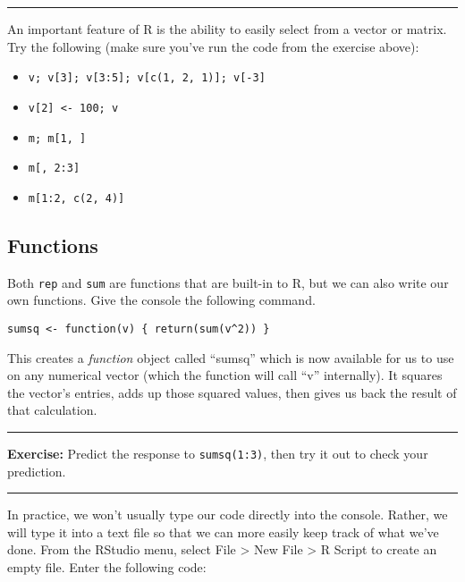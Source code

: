 \documentclass[]{book}
\providecommand{\tightlist}{%
  \setlength{\itemsep}{0pt}\setlength{\parskip}{0pt}}
\theoremstyle{definition}
\theoremstyle{definition}
\theoremstyle{definition}
\theoremstyle{remark}
\begin{document}
\begin{center}\rule{0.5\linewidth}{\linethickness}\end{center}

An important feature of R is the ability to easily select from a vector
or matrix. Try the following (make sure you've run the code from the
exercise above):

\begin{itemize}
\tightlist
\item
  \texttt{v;\ v{[}3{]};\ v{[}3:5{]};\ v{[}c(1,\ 2,\ 1){]};\ v{[}-3{]}}
\item
  \texttt{v{[}2{]}\ \textless{}-\ 100;\ v}
\item
  \texttt{m;\ m{[}1,\ {]}}
\item
  \texttt{m{[},\ 2:3{]}}
\item
  \texttt{m{[}1:2,\ c(2,\ 4){]}}
\end{itemize}

\hypertarget{functions}{%
\subsection{Functions}\label{functions}}

Both \texttt{rep} and \texttt{sum} are functions that are built-in to R,
but we can also write our own functions. Give the console the following
command.

\begin{verbatim}
sumsq <- function(v) { return(sum(v^2)) }
\end{verbatim}

This creates a \emph{function} object called ``sumsq'' which is now
available for us to use on any numerical vector (which the function will
call ``v'' internally). It squares the vector's entries, adds up those
squared values, then gives us back the result of that calculation.

\begin{center}\rule{0.5\linewidth}{\linethickness}\end{center}

\textbf{Exercise:} Predict the response to \texttt{sumsq(1:3)}, then try
it out to check your prediction.

\begin{center}\rule{0.5\linewidth}{\linethickness}\end{center}

In practice, we won't usually type our code directly into the console.
Rather, we will type it into a text file so that we can more easily keep
track of what we've done. From the RStudio menu, select File
\textgreater{} New File \textgreater{} R Script to create an empty file.
Enter the following code:
\end{document}
